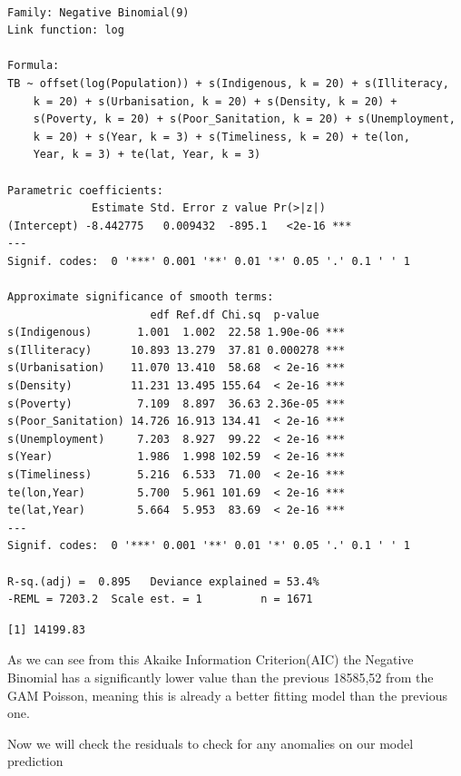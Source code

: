 \documentclass[
  letterpaper,
  DIV=11,
  numbers=noendperiod]{scrartcl}
\newenvironment{Shaded}{\begin{snugshade}}{\end{snugshade}}
\newcommand{\CommentTok}[1]{\textcolor[rgb]{0.37,0.37,0.37}{#1}}
\newcommand{\NormalTok}[1]{\textcolor[rgb]{0.00,0.23,0.31}{#1}}
\newcommand{\SpecialCharTok}[1]{\textcolor[rgb]{0.37,0.37,0.37}{#1}}
\begin{document}
\begin{verbatim}

Family: Negative Binomial(9) 
Link function: log 

Formula:
TB ~ offset(log(Population)) + s(Indigenous, k = 20) + s(Illiteracy, 
    k = 20) + s(Urbanisation, k = 20) + s(Density, k = 20) + 
    s(Poverty, k = 20) + s(Poor_Sanitation, k = 20) + s(Unemployment, 
    k = 20) + s(Year, k = 3) + s(Timeliness, k = 20) + te(lon, 
    Year, k = 3) + te(lat, Year, k = 3)

Parametric coefficients:
             Estimate Std. Error z value Pr(>|z|)    
(Intercept) -8.442775   0.009432  -895.1   <2e-16 ***
---
Signif. codes:  0 '***' 0.001 '**' 0.01 '*' 0.05 '.' 0.1 ' ' 1

Approximate significance of smooth terms:
                      edf Ref.df Chi.sq  p-value    
s(Indigenous)       1.001  1.002  22.58 1.90e-06 ***
s(Illiteracy)      10.893 13.279  37.81 0.000278 ***
s(Urbanisation)    11.070 13.410  58.68  < 2e-16 ***
s(Density)         11.231 13.495 155.64  < 2e-16 ***
s(Poverty)          7.109  8.897  36.63 2.36e-05 ***
s(Poor_Sanitation) 14.726 16.913 134.41  < 2e-16 ***
s(Unemployment)     7.203  8.927  99.22  < 2e-16 ***
s(Year)             1.986  1.998 102.59  < 2e-16 ***
s(Timeliness)       5.216  6.533  71.00  < 2e-16 ***
te(lon,Year)        5.700  5.961 101.69  < 2e-16 ***
te(lat,Year)        5.664  5.953  83.69  < 2e-16 ***
---
Signif. codes:  0 '***' 0.001 '**' 0.01 '*' 0.05 '.' 0.1 ' ' 1

R-sq.(adj) =  0.895   Deviance explained = 53.4%
-REML = 7203.2  Scale est. = 1         n = 1671
\end{verbatim}

\begin{Shaded}
\end{Shaded}

\begin{verbatim}
[1] 14199.83
\end{verbatim}

As we can see from this Akaike Information Criterion(AIC) the Negative
Binomial has a significantly lower value than the previous 18585,52 from
the GAM Poisson, meaning this is already a better fitting model than the
previous one.

Now we will check the residuals to check for any anomalies on our model
prediction
\end{document}
